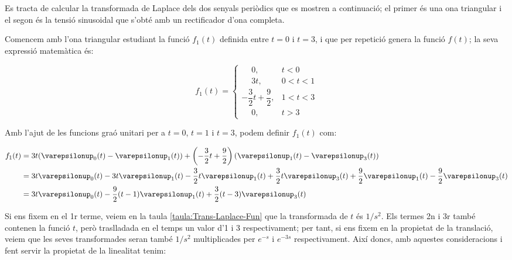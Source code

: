 	
\begin{exemple}[\CalcTransfLaplace{}]
	\addcontentsxms{\CalcTransfLaplace}
    Es tracta de calcular la transformada de Laplace dels dos
    senyals periòdics que es mostren a continuació; el primer és una
    ona triangular i el segon és la tensió sinusoidal que s'obté amb un
    rectificador d'ona completa.

    \begin{center}
        
    \end{center}

    Comencem amb l'ona triangular estudiant la funció $f_1(t)$ definida
    entre $t=0$ i $t=3$, i que per repetició genera la funció $f(t)$; la
    seva expressió matemàtica és:

    \[
        f_1(t) = \begin{cases}
        \phantom{-}0, & t < 0\\
        \phantom{-}3t, & 0<t<1 \\
        -\dfrac{3}{2}t +\dfrac{9}{2}, & 1 < t < 3 \\
        \phantom{-}0, & t > 3 \end{cases}
    \]

    Amb l'ajut de les funcions graó unitari per a $t=0$, $t=1$ i $t=3$,
    podem definir $f_1(t)$ com:

    \[\begin{split}
        f_1(t) &= 3t (\varepsilonup_0(t) - \varepsilonup_1(t)) + \left(-\frac{3}{2}t
        +\frac{9}{2}\right) (\varepsilonup_1(t) -
        \varepsilonup_3(t))  \\
        &=
        3t\varepsilonup_0(t)-3t\varepsilonup_1(t)-\frac{3}{2}t \varepsilonup_1(t)
        +\frac{3}{2}t \varepsilonup_3(t) +\frac{9}{2} \varepsilonup_1(t)
        -\frac{9}{2} \varepsilonup_3(t)  \\
        &=3t\varepsilonup_0(t) -\frac{9}{2}(t-1)\varepsilonup_1(t) +
        \frac{3}{2}(t-3)\varepsilonup_3(t)
    \end{split}\]

    Si ens fixem en el 1r terme, veiem en la taula
    \vref{taula:Trans-Laplace-Fun} que la  transformada de $t$ és $1/s^2$.
    Els termes 2n i 3r també contenen la funció $t$, però traslladada
    en el temps un valor d'1 i 3 respectivament; per tant, si ens fixem
    en la propietat de la translació, veiem que les seves transformades
    seran també $1/s^2$ multiplicades per $e^{-s}$ i $e^{-3s}$
    respectivament. Així doncs, amb aquestes consideracions i fent
    servir la propietat de la linealitat tenim:


\end{exemple}
